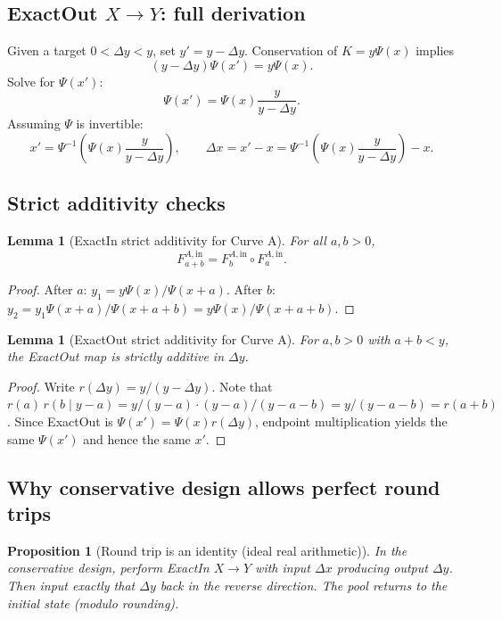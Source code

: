 \documentclass[11pt]{article}
\newtheorem{lemma}[theorem]{Lemma}
\newtheorem{proposition}[theorem]{Proposition}
\theoremstyle{definition}
\theoremstyle{remark}
\newcommand{\dx}{\Delta x}
\newcommand{\dy}{\Delta y}
\begin{document}
\subsection{ExactOut $X\to Y$: full derivation}

Given a target $0<\dy<y$, set $y'=y-\dy$.
Conservation of $K=y\Psi(x)$ implies
\[
 (y-\dy)\Psi(x') = y\Psi(x).
\]
Solve for $\Psi(x')$:
\[
 \Psi(x') = \Psi(x)\frac{y}{y-\dy}.
\]
Assuming $\Psi$ is invertible:
\[
 x' = \Psi^{-1}\!\left(\Psi(x)\frac{y}{y-\dy}\right),\qquad
 \boxed{\dx = x'-x = \Psi^{-1}\!\left(\Psi(x)\frac{y}{y-\dy}\right)-x.}
\]

\subsection{Strict additivity checks}

\begin{lemma}[ExactIn strict additivity for Curve A]
For all $a,b>0$,
\[
F^{A,\mathrm{in}}_{a+b} = F^{A,\mathrm{in}}_b\circ F^{A,\mathrm{in}}_a.
\]
\end{lemma}

\begin{proof}
After $a$: $y_1=y\Psi(x)/\Psi(x+a)$. After $b$: $y_2=y_1\Psi(x+a)/\Psi(x+a+b)=y\Psi(x)/\Psi(x+a+b)$.
\end{proof}

\begin{lemma}[ExactOut strict additivity for Curve A]
For $a,b>0$ with $a+b<y$, the ExactOut map is strictly additive in $\dy$.
\end{lemma}

\begin{proof}
Write $r(\dy)=y/(y-\dy)$. Note that $r(a)\,r(b\mid y-a)=y/(y-a)\cdot (y-a)/(y-a-b)=y/(y-a-b)=r(a+b)$.
Since ExactOut is $\Psi(x')=\Psi(x)r(\dy)$, endpoint multiplication yields the same $\Psi(x')$ and hence the same $x'$.
\end{proof}

\subsection{Why conservative design allows perfect round trips}

\begin{proposition}[Round trip is an identity (ideal real arithmetic)]
In the conservative design, perform ExactIn $X\to Y$ with input $\dx$ producing output $\dy$. Then input exactly that $\dy$ back in the reverse direction. The pool returns to the initial state (modulo rounding).
\end{proposition}
\end{document}
